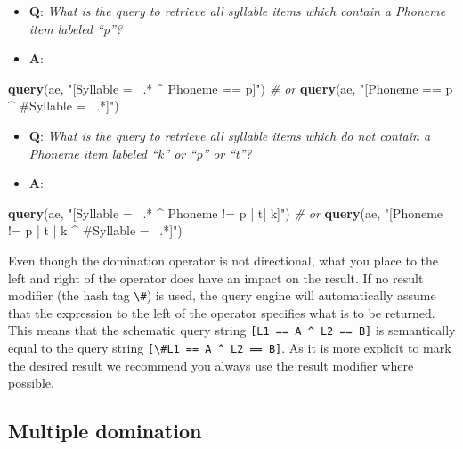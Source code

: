 \documentclass[]{book}
\newenvironment{Shaded}{\begin{snugshade}}{\end{snugshade}}
\newcommand{\CommentTok}[1]{\textcolor[rgb]{0.56,0.35,0.01}{\textit{#1}}}
\newcommand{\KeywordTok}[1]{\textcolor[rgb]{0.13,0.29,0.53}{\textbf{#1}}}
\newcommand{\NormalTok}[1]{#1}
\newcommand{\StringTok}[1]{\textcolor[rgb]{0.31,0.60,0.02}{#1}}
\providecommand{\tightlist}{%
  \setlength{\itemsep}{0pt}\setlength{\parskip}{0pt}}
\theoremstyle{definition}
\theoremstyle{definition}
\theoremstyle{definition}
\theoremstyle{remark}
\begin{document}
\begin{itemize}
\tightlist
\item
  \textbf{Q}: \emph{What is the query to retrieve all syllable items
  which contain a Phoneme item labeled ``p''?}
\item
  \textbf{A}:
\end{itemize}

\begin{Shaded}
\begin{Highlighting}[]
\KeywordTok{query}\NormalTok{(ae, }\StringTok{"[Syllable =~ .* ^ Phoneme == p]"}\NormalTok{) }
\CommentTok{# or }
\KeywordTok{query}\NormalTok{(ae, }\StringTok{"[Phoneme == p ^ #Syllable =~ .*]"}\NormalTok{)}
\end{Highlighting}
\end{Shaded}

\begin{itemize}
\tightlist
\item
  \textbf{Q}: \emph{What is the query to retrieve all syllable items
  which do not contain a Phoneme item labeled ``k'' or ``p'' or ``t''?}
\item
  \textbf{A}:
\end{itemize}

\begin{Shaded}
\begin{Highlighting}[]
\KeywordTok{query}\NormalTok{(ae, }\StringTok{"[Syllable =~ .* ^ Phoneme != p | t| k]"}\NormalTok{)}
\CommentTok{# or }
\KeywordTok{query}\NormalTok{(ae, }\StringTok{"[Phoneme != p | t | k ^ #Syllable =~ .*]"}\NormalTok{)}
\end{Highlighting}
\end{Shaded}

Even though the domination operator is not directional, what you place
to the left and right of the operator does have an impact on the result.
If no result modifier (the hash tag \texttt{\textbackslash{}\#}) is
used, the query engine will automatically assume that the expression to
the left of the operator specifies what is to be returned. This means
that the schematic query string
\texttt{{[}L1\ ==\ A\ \^{}\ L2\ ==\ B{]}} is semantically equal to the
query string
\texttt{{[}\textbackslash{}\#L1\ ==\ A\ \^{}\ L2\ ==\ B{]}}. As it is
more explicit to mark the desired result we recommend you always use the
result modifier where possible.

\hypertarget{multiple-domination}{%
\subsection{Multiple domination}\label{multiple-domination}}
\end{document}
